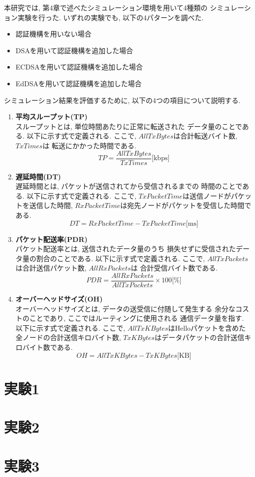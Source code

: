 本研究では, 第4章で述べたシミュレーション環境を用いて4種類の
シミュレーション実験を行った. いずれの実験でも, 以下の4パターンを調べた. 
\begin{itemize}
  \item 認証機構を用いない場合
  \item DSAを用いて認証機構を追加した場合
  \item ECDSAを用いて認証機構を追加した場合
  \item EdDSAを用いて認証機構を追加した場合
\end{itemize}
\indent シミュレーション結果を評価するために, 
以下の4つの項目について説明する. 
\begin{enumerate}
  \item \textbf{平均スループット(TP)}\\
  \indent スループットとは, 単位時間あたりに正常に転送された
  データ量のことである. 以下に示す式で定義される. ここで, 
  $AllTxBytes$は合計転送バイト数, $TxTimes$は
  転送にかかった時間である. \\
  \[
    TP = \frac{AllTxBytes}{TxTimes}\text{[kbps]}
  \]
  \item \textbf{遅延時間(DT)}\\
  \indent 遅延時間とは, パケットが送信されてから受信されるまでの
  時間のことである. 以下に示す式で定義される. ここで,
  $TxPacketTime$は送信ノードがパケットを送信した時間, 
  $RxPacketTime$は宛先ノードがパケットを受信した時間である. \\
  \[
    DT = RxPacketTime - TxPacketTime \text{[ms]}
  \]

  \item \textbf{パケット配送率(PDR)}\\
  \indent パケット配送率とは, 送信されたデータ量のうち
  損失せずに受信されたデータ量の割合のことである. 以下に示す式で定義される. 
  ここで, $AllTxPackets$は合計送信パケット数, $AllRxPackets$は
  合計受信バイト数である. \\
  \[
    PDR = \frac{AllRxPackets}{AllTxPackets} \times 100 \text{[\%]}
  \]

  \item \textbf{オーバーヘッドサイズ(OH)}\\
  \indent オーバーヘッドサイズとは, データの送受信に付随して発生する
  余分なコストのことであり, ここではルーティングに使用される
  通信データ量を指す. 以下に示す式で定義される. ここで, 
  $AllTxKBytes$はHelloパケットを含めた全ノードの合計送信キロバイト数, 
  $TxKBytes$はデータパケットの合計送信キロバイト数である. \\
  \[
    OH = AllTxKBytes - TxKBytes \text{[KB]}
  \]
\end{enumerate}


\section{実験1}

\section{実験2}

\section{実験3}
